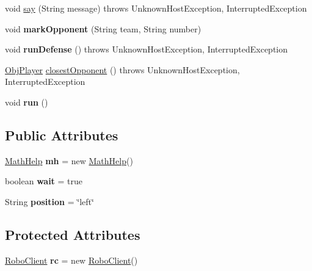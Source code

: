 \begin{DoxyCompactItemize}
\item 
void \hyperlink{classPlayer_a1b324554699cfab5d15fff4ba242e396}{say} (String message)  throws UnknownHostException, InterruptedException 
\item 
\hypertarget{classPlayer_ae6228d1bf70424d89e6a587326c86b46}{
void {\bfseries markOpponent} (String team, String number)}
\label{classPlayer_ae6228d1bf70424d89e6a587326c86b46}

\item 
\hypertarget{classPlayer_a399cde63b4187594789bee245f1f01a3}{
void {\bfseries runDefense} ()  throws UnknownHostException, InterruptedException }
\label{classPlayer_a399cde63b4187594789bee245f1f01a3}

\item 
\hyperlink{classObjPlayer}{ObjPlayer} \hyperlink{classPlayer_aa94877ea707329aee80c15163c184ef7}{closestOpponent} ()  throws UnknownHostException, InterruptedException 
\item 
\hypertarget{classPlayer_a499cc0cb1e2fb8bdb8139c8848b367b9}{
void {\bfseries run} ()}
\label{classPlayer_a499cc0cb1e2fb8bdb8139c8848b367b9}

\end{DoxyCompactItemize}
\subsection*{Public Attributes}
\begin{DoxyCompactItemize}
\item 
\hypertarget{classPlayer_a7c430c6135e7adaab49cde397ceb31a4}{
\hyperlink{classMathHelp}{MathHelp} {\bfseries mh} = new \hyperlink{classMathHelp}{MathHelp}()}
\label{classPlayer_a7c430c6135e7adaab49cde397ceb31a4}

\item 
\hypertarget{classPlayer_a5febfb25d5578b52b97e02df2481c6ca}{
boolean {\bfseries wait} = true}
\label{classPlayer_a5febfb25d5578b52b97e02df2481c6ca}

\item 
\hypertarget{classPlayer_af5eb74245ac4311ade5eae02245112af}{
String {\bfseries position} = \char`\"{}left\char`\"{}}
\label{classPlayer_af5eb74245ac4311ade5eae02245112af}

\end{DoxyCompactItemize}
\subsection*{Protected Attributes}
\begin{DoxyCompactItemize}
\item 
\hypertarget{classPlayer_a56dbc9d8a3e1a70f6d9c83b8af3dd49e}{
\hyperlink{classRoboClient}{RoboClient} {\bfseries rc} = new \hyperlink{classRoboClient}{RoboClient}()}
\label{classPlayer_a56dbc9d8a3e1a70f6d9c83b8af3dd49e}

\end{DoxyCompactItemize}


